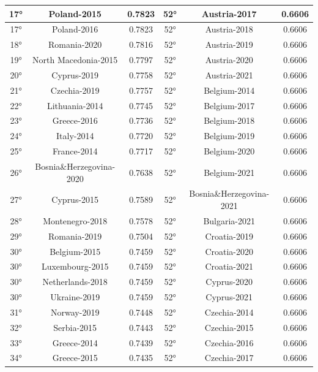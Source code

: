 \documentclass[a4paper,12pt, openright]{report}
\begin{document}
\begin{longtable}[c]{|c|c|c|c|c|c|}
    \hline
    17° & Poland-2015 & 0.7823 & 52° & Austria-2017 & 0.6606 \\
    \hline
    17° & Poland-2016 & 0.7823 & 52° & Austria-2018 & 0.6606 \\
    \hline
    18° & Romania-2020 & 0.7816 & 52°& Austria-2019 & 0.6606 \\
    \hline
    19° & North Macedonia-2015	& 0.7797 & 52° & Austria-2020 & 0.6606  \\
    \hline
    20° & Cyprus-2019 & 0.7758 & 52° & Austria-2021 & 0.6606 \\
    \hline
    21° & Czechia-2019	& 0.7757 & 52°	& Belgium-2014 & 0.6606 \\
    \hline
    22° & Lithuania-2014 & 0.7745 & 52° & Belgium-2017 & 0.6606 \\
    \hline
    23° & Greece-2016 & 0.7736 & 52° & Belgium-2018 & 0.6606 \\
    \hline
    24° & Italy-2014 & 0.7720 & 52° & Belgium-2019 & 0.6606 \\
    \hline
    25° & France-2014 & 0.7717 & 52° & Belgium-2020 & 0.6606 \\
    \hline
    26° & Bosnia\&Herzegovina-2020 & 0.7638 & 52° & Belgium-2021 & 0.6606 \\
    \hline
    27° & Cyprus-2015 & 0.7589 & 52° & Bosnia\&Herzegovina-2021  & 0.6606  \\
    \hline
    28° & Montenegro-2018 & 0.7578 & 52° & Bulgaria-2021 & 0.6606 \\
    \hline
    29° & Romania-2019	& 0.7504 & 52° & Croatia-2019 & 0.6606 \\
    \hline
    30° & Belgium-2015	 & 0.7459 & 52° & Croatia-2020	& 0.6606  \\
    \hline
    30° & Luxembourg-2015 & 0.7459 & 52° & Croatia-2021 & 0.6606 \\
    \hline
    30° & Netherlands-2018	& 0.7459 & 52° & Cyprus-2020 & 0.6606 \\
    \hline
    30° & Ukraine-2019	& 0.7459 & 52°	& Cyprus-2021 & 0.6606  \\
    \hline
    31° & Norway-2019 & 0.7448 & 52° & Czechia-2014 & 0.6606 \\
    \hline
    32° & Serbia-2015 & 0.7443 & 52° & Czechia-2015 & 0.6606 \\
    \hline
    33° & Greece-2014  & 0.7439 & 52° & Czechia-2016 & 0.6606 \\
    \hline
    34° & Greece-2015 & 0.7435 & 52° & Czechia-2017 & 0.6606 \\
    \hline

\end{longtable}
\end{document}
